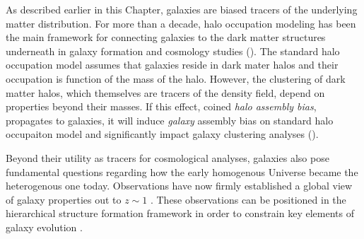 As described earlier in this Chapter, galaxies are biased tracers of the 
underlying matter distribution. For more than a decade, halo occupation 
modeling has been the main framework for connecting galaxies
to the dark matter structures underneath in galaxy formation and cosmology
studies (). The standard halo occupation model
assumes that galaxies reside in dark mater halos and their occupation 
is function of the mass of the halo. However, the clustering of dark 
matter halos, which themselves are tracers of the density field, 
depend on properties beyond their masses. If this effect, coined 
{\em halo assembly bias}, propagates to galaxies, it will induce 
{\em galaxy} assembly bias on standard halo occupaiton model and 
significantly impact galaxy clustering analyses (). 

Beyond their utility as tracers for cosmological analyses, galaxies 
also pose fundamental questions regarding how the early homogenous 
Universe became the heterogenous one today. Observations have now 
firmly established a global view of galaxy properties out to $z\sim1$ 
\citep[\emph{e.g.}][]{Blanton:2009aa, Moustakas:2013aa}.
These observations can be positioned in the hierarchical structure 
formation framework in order to constrain key elements of galaxy evolution 
\citep[][]{Wetzel:2013aa}. 



